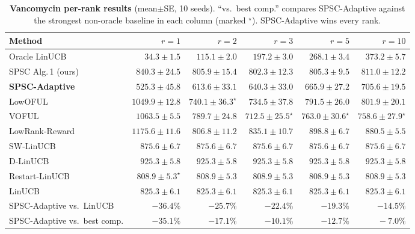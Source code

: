 \documentclass{article}
\begin{document}
\begin{table}[!htbp]
\centering
\caption{\textbf{Vancomycin per-rank results} (mean$\pm$SE, 10
seeds). ``vs.\ best comp.'' compares SPSC-Adaptive against the
strongest non-oracle baseline in each column (marked $^\star$).
SPSC-Adaptive wins every rank.}
\label{tab:vancomycin_full}
\footnotesize
\setlength{\tabcolsep}{2pt}
\begin{tabular}{l@{\hskip 3pt}rrrrr}
\toprule
Method & $r{=}1$ & $r{=}2$ & $r{=}3$ & $r{=}5$ & $r{=}10$ \\
\midrule
Oracle LinUCB                & $34.3\pm 1.5$    & $115.1\pm 2.0$   & $197.2\pm 3.0$         & $268.1\pm 3.4$         & $373.2\pm 5.7$ \\
SPSC Alg.\,1 (ours)          & $840.3\pm 24.5$  & $805.9\pm 15.4$  & $802.3\pm 12.3$        & $805.3\pm 9.5$         & $811.0\pm 12.2$ \\
\textbf{SPSC-Adaptive}       & $\mathbf{525.3\pm 45.8}$ & $\mathbf{613.6\pm 33.1}$ & $\mathbf{640.3\pm 33.0}$ & $\mathbf{665.9\pm 27.2}$ & $\mathbf{705.6\pm 19.5}$ \\
LowOFUL                      & $1049.9\pm 12.8$ & $740.1\pm 36.3^\star$  & $734.5\pm 37.8$        & $791.5\pm 26.0$        & $801.9\pm 20.1$ \\
VOFUL                        & $1063.5\pm 5.5$  & $789.7\pm 24.8$  & $712.5\pm 25.5^\star$  & $763.0\pm 30.6^\star$  & $758.6\pm 27.9^\star$ \\
LowRank-Reward               & $1175.6\pm 11.6$ & $806.8\pm 11.2$  & $835.1\pm 10.7$        & $898.8\pm 6.7$         & $880.5\pm 5.5$ \\
SW-LinUCB                    & $875.6\pm 6.7$   & $875.6\pm 6.7$   & $875.6\pm 6.7$         & $875.6\pm 6.7$         & $875.6\pm 6.7$ \\
D-LinUCB                     & $925.3\pm 5.8$   & $925.3\pm 5.8$   & $925.3\pm 5.8$         & $925.3\pm 5.8$         & $925.3\pm 5.8$ \\
Restart-LinUCB               & $808.9\pm 5.3^\star$ & $808.9\pm 5.3$ & $808.9\pm 5.3$         & $808.9\pm 5.3$         & $808.9\pm 5.3$ \\
LinUCB                       & $825.3\pm 6.1$   & $825.3\pm 6.1$   & $825.3\pm 6.1$         & $825.3\pm 6.1$         & $825.3\pm 6.1$ \\
\midrule
\multicolumn{1}{l}{SPSC-Adaptive vs.\ LinUCB}     & $-36.4\%$ & $-25.7\%$ & $-22.4\%$ & $-19.3\%$ & $-14.5\%$ \\
\multicolumn{1}{l}{SPSC-Adaptive vs.\ best comp.} & $-35.1\%$ & $-17.1\%$ & $-10.1\%$ & $-12.7\%$ & $\phantom{-}-7.0\%$ \\
\bottomrule
\end{tabular}
\end{table}
\end{document}
